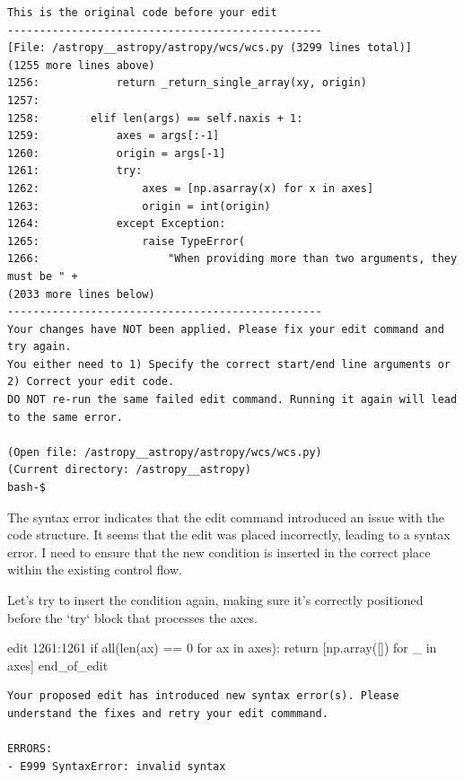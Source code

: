 {\begin{observationbox}
\begin{Verbatim}[breaklines=true, breakanywhere=true]
This is the original code before your edit
-------------------------------------------------
[File: /astropy__astropy/astropy/wcs/wcs.py (3299 lines total)]
(1255 more lines above)
1256:            return _return_single_array(xy, origin)
1257:
1258:        elif len(args) == self.naxis + 1:
1259:            axes = args[:-1]
1260:            origin = args[-1]
1261:            try:
1262:                axes = [np.asarray(x) for x in axes]
1263:                origin = int(origin)
1264:            except Exception:
1265:                raise TypeError(
1266:                    "When providing more than two arguments, they must be " +
(2033 more lines below)
-------------------------------------------------
Your changes have NOT been applied. Please fix your edit command and try again.
You either need to 1) Specify the correct start/end line arguments or 2) Correct your edit code.
DO NOT re-run the same failed edit command. Running it again will lead to the same error.

(Open file: /astropy__astropy/astropy/wcs/wcs.py)
(Current directory: /astropy__astropy)
bash-$
\end{Verbatim}
\end{observationbox}
\begin{agentbox}
The syntax error indicates that the edit command introduced an issue with the code structure. It seems that the edit was placed incorrectly, leading to a syntax error. I need to ensure that the new condition is inserted in the correct place within the existing control flow.



Let's try to insert the condition again, making sure it's correctly positioned before the `try` block that processes the axes.

\hrulefill
\begin{CodeVerbatim}[breaklines=true, breakanywhere=true]
edit 1261:1261
            if all(len(ax) == 0 for ax in axes):
                return [np.array([]) for _ in axes]
end_of_edit
\end{CodeVerbatim}
\end{agentbox}
\begin{observationbox}\begin{Verbatim}[breaklines=true, breakanywhere=true]
Your proposed edit has introduced new syntax error(s). Please understand the fixes and retry your edit commmand.

ERRORS:
- E999 SyntaxError: invalid syntax


\end{Verbatim}
\end{observationbox}}
